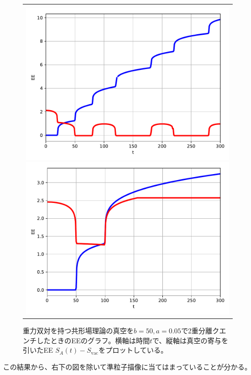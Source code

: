 \begin{figure}[H]
\begin{tabular}{c}
		\begin{minipage}{0.06\hsize}
			\vspace{10mm}
		\end{minipage} \\
		\begin{minipage}{0.50\hsize}
			\centering
			\includegraphics[width=\linewidth]{dh528_30_100.pdf}
		\end{minipage}
		\begin{minipage}{0.50\hsize}
			\centering
			\includegraphics[width=\linewidth]{dh528_150_100.pdf}
		\end{minipage}
	\end{tabular}
	\caption{重力双対を持つ共形場理論の真空を$b=50,a=0.05$で2重分離クエンチしたときのEEのグラフ。横軸は時間$t$で、縦軸は真空の寄与を引いたEE $S_A(t)-S_\text{vac}$をプロットしている。}
	\label{fig:dh528}
\end{figure}
この結果から、右下の図を除いて準粒子描像に当てはまっていることが分かる。

